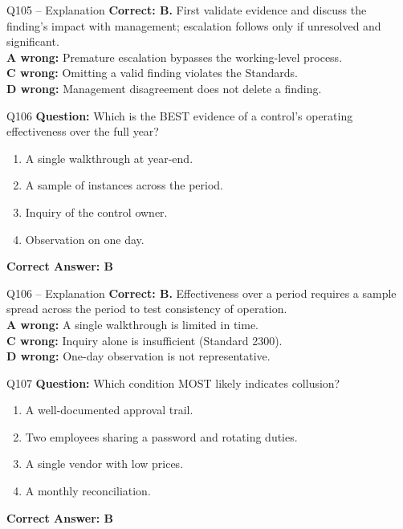 \documentclass[aspectratio=169,10pt]{beamer}
\begin{document}
	\begin{frame}[t]{Q105 -- Explanation}
		\small
		\textbf{Correct: B.} First validate evidence and discuss the finding's impact with management; escalation follows only if unresolved and significant. \\[4pt]
		\textbf{A wrong:} Premature escalation bypasses the working-level process. \\[2pt]
		\textbf{C wrong:} Omitting a valid finding violates the Standards. \\[2pt]
		\textbf{D wrong:} Management disagreement does not delete a finding.
	\end{frame}
	
	\begin{frame}[t]{Q106}
		\small
		\textbf{Question:} Which is the BEST evidence of a control's operating effectiveness over the full year?
		\begin{enumerate}[label=\Alph*.,itemsep=1pt,topsep=2pt]
			\item A single walkthrough at year-end.
			\item A sample of instances across the period.
			\item Inquiry of the control owner.
			\item Observation on one day.
		\end{enumerate}
		\vspace{4pt}
		\textbf{Correct Answer: B}
	\end{frame}
	
	\begin{frame}[t]{Q106 -- Explanation}
		\small
		\textbf{Correct: B.} Effectiveness over a period requires a sample spread across the period to test consistency of operation. \\[4pt]
		\textbf{A wrong:} A single walkthrough is limited in time. \\[2pt]
		\textbf{C wrong:} Inquiry alone is insufficient (Standard 2300). \\[2pt]
		\textbf{D wrong:} One-day observation is not representative.
	\end{frame}
	
	\begin{frame}[t]{Q107}
		\small
		\textbf{Question:} Which condition MOST likely indicates collusion?
		\begin{enumerate}[label=\Alph*.,itemsep=1pt,topsep=2pt]
			\item A well-documented approval trail.
			\item Two employees sharing a password and rotating duties.
			\item A single vendor with low prices.
			\item A monthly reconciliation.
		\end{enumerate}
		\vspace{4pt}
		\textbf{Correct Answer: B}
	\end{frame}
	
\end{document}
